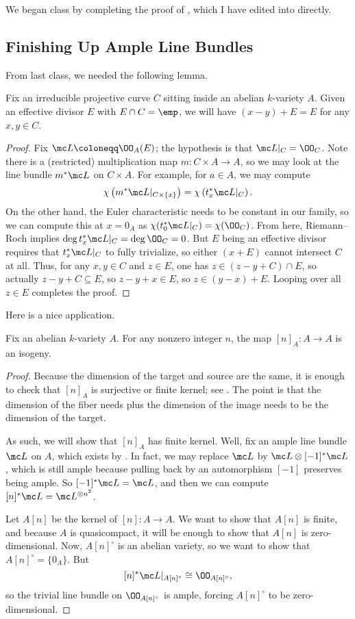 \documentclass[../notes.tex]{subfiles}
\begin{document}
We began class by completing the proof of , which I have edited into directly.

\subsection{Finishing Up Ample Line Bundles}
From last class, we needed the following lemma.
\begin{lemma} \label{lem:translate-curve}
	Fix an irreducible projective curve $C$ sitting inside an abelian $k$-variety $A$. Given an effective divisor $E$ with $E\cap C=\emp$, we will have $(x-y)+E=E$ for any $x,y\in C$.
\end{lemma}
\begin{proof}
	Fix $\mc L\coloneqq\OO_A(E)$; the hypothesis is that $\mc L|_C=\OO_C$. Note there is a (restricted) multiplication map $m\colon C\times A\to A$, so we may look at the line bundle $m^*\mc L$ on $C\times A$. For example, for $a\in A$, we may compute
	\[\chi\left(m^*\mc L|_{C\times\{x\}}\right)=\chi\left(t_x^*\mc L|_C\right).\]
	On the other hand, the Euler characteristic needs to be constant in our family, so we can compute this at $x=0_A$ as $\chi(t_0^*\mc L|_C)=\chi(\OO_C)$. From here, Riemann--Roch implies $\deg t_x^*\mc L|_C=\deg\OO_C=0$. But $E$ being an effective divisor requires that $t_x^*\mc L|_C$ to fully trivialize, so either $(x+E)$ cannot intersect $C$ at all. Thus, for any $x,y\in C$ and $z\in E$, one has $z\in(z-y+C)\cap E$, so actually $z-y+C\subseteq E$, so $z-y+x\in E$, so $z\in(y-x)+E$. Looping over all $z\in E$ completes the proof.
\end{proof}
Here is a nice application.
\begin{corollary} \label{cor:n-isog}
	Fix an abelian $k$-variety $A$. For any nonzero integer $n$, the map $[n]_A\colon A\to A$ is an isogeny.
\end{corollary}
\begin{proof}
	Because the dimension of the target and source are the same, it is enough to check that $[n]_A$ is surjective or finite kernel; see \cite[Proposition~7.1]{milne-av}. The point is that the dimension of the fiber needs plus the dimension of the image needs to be the dimension of the target.

	As such, we will show that $[n]_A$ has finite kernel. Well, fix an ample line bundle $\mc L$ on $A$, which exists by . In fact, we may replace $\mc L$ by $\mc L\otimes[-1]^*\mc L$, which is still ample because pulling back by an automorphism $[-1]$ preserves being ample. So $[-1]^*\mc L=\mc L$, and then we can compute $[n]^*\mc L=\mc L^{\otimes n^2}$.

	Let $A[n]$ be the kernel of $[n]\colon A\to A$. We want to show that $A[n]$ is finite, and because $A$ is quasicompact, it will be enough to show that $A[n]$ is zero-dimensional. Now, $A[n]^\circ$ is an abelian variety, so we want to show that $A[n]^\circ=\{0_A\}$. But
	\[[n]^*\mc L|_{A[n]^\circ}\cong\OO_{A[n]^\circ},\]
	so the trivial line bundle on $\OO_{A[n]^\circ}$ is ample, forcing $A[n]^\circ$ to be zero-dimensional.
\end{proof}
\end{document}
